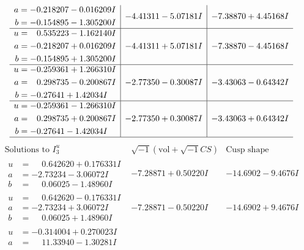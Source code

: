 \documentclass[1p]{elsarticle_modified}
\theoremstyle{definition}
\newcommand{\I}{\sqrt{-1}}
\begin{document}
$$\begin{array}{c|c|c}
\begin{aligned}
a &= -0.218207 - 0.016209 I \\
b &= -0.154895 - 1.305200 I\end{aligned}
 & -4.41311 - 5.07181 I & -7.38870 + 4.45168 I \\ \hline\begin{aligned}
u &= \phantom{-}0.535223 - 1.162140 I \\
a &= -0.218207 + 0.016209 I \\
b &= -0.154895 + 1.305200 I\end{aligned}
 & -4.41311 + 5.07181 I & -7.38870 - 4.45168 I \\ \hline\begin{aligned}
u &= -0.259361 + 1.266310 I \\
a &= \phantom{-}0.298735 - 0.200867 I \\
b &= -0.27641 + 1.42034 I\end{aligned}
 & -2.77350 - 0.30087 I & -3.43063 - 0.64342 I \\ \hline\begin{aligned}
u &= -0.259361 - 1.266310 I \\
a &= \phantom{-}0.298735 + 0.200867 I \\
b &= -0.27641 - 1.42034 I\end{aligned}
 & -2.77350 + 0.30087 I & -3.43063 + 0.64342 I\\
 \hline 
 \end{array}$$\newpage$$\begin{array}{c|c|c}  
\text{Solutions to }I^u_{3}& \I (\text{vol} + \sqrt{-1}CS) & \text{Cusp shape}\\
 \hline 
\begin{aligned}
u &= \phantom{-}0.642620 + 0.176331 I \\
a &= -2.73234 - 3.06072 I \\
b &= \phantom{-}0.06025 - 1.48960 I\end{aligned}
 & -7.28871 + 0.50220 I & -14.6902 - 9.4676 I \\ \hline\begin{aligned}
u &= \phantom{-}0.642620 - 0.176331 I \\
a &= -2.73234 + 3.06072 I \\
b &= \phantom{-}0.06025 + 1.48960 I\end{aligned}
 & -7.28871 - 0.50220 I & -14.6902 + 9.4676 I \\ \hline\begin{aligned}
u &= -0.314004 + 0.270023 I \\
a &= \phantom{-}11.33940 - 1.30281 I \\

\end{aligned}
\end{array}$$
\end{document}
